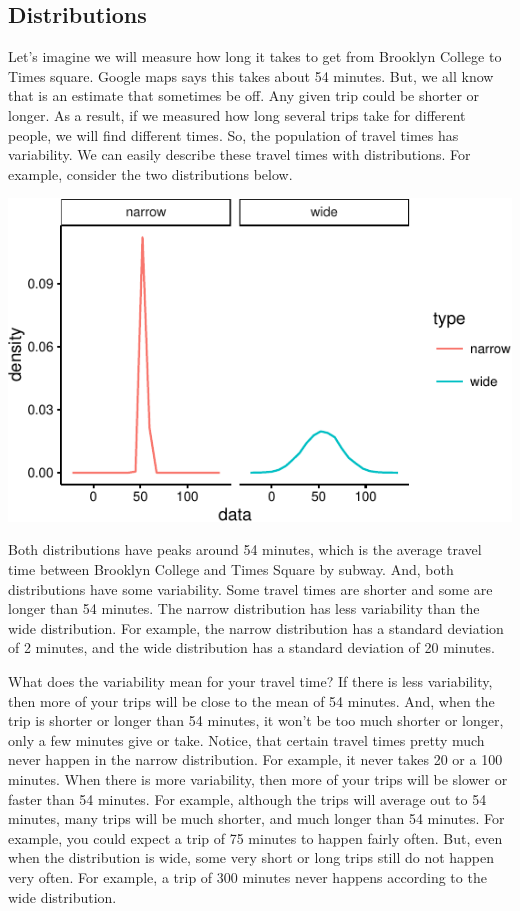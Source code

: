 
\subsection{Distributions}\label{distributions}

Let's imagine we will measure how long it takes to get from Brooklyn
College to Times square. Google maps says this takes about 54 minutes.
But, we all know that is an estimate that sometimes be off. Any given
trip could be shorter or longer. As a result, if we measured how long
several trips take for different people, we will find different times.
So, the population of travel times has variability. We can easily
describe these travel times with distributions. For example, consider
the two distributions below.

\includegraphics{Ttest_files/figure-latex/unnamed-chunk-1-1}

Both distributions have peaks around 54 minutes, which is the average
travel time between Brooklyn College and Times Square by subway. And,
both distributions have some variability. Some travel times are shorter
and some are longer than 54 minutes. The narrow distribution has less
variability than the wide distribution. For example, the narrow
distribution has a standard deviation of 2 minutes, and the wide
distribution has a standard deviation of 20 minutes.

What does the variability mean for your travel time? If there is less
variability, then more of your trips will be close to the mean of 54
minutes. And, when the trip is shorter or longer than 54 minutes, it
won't be too much shorter or longer, only a few minutes give or take.
Notice, that certain travel times pretty much never happen in the narrow
distribution. For example, it never takes 20 or a 100 minutes. When
there is more variability, then more of your trips will be slower or
faster than 54 minutes. For example, although the trips will average out
to 54 minutes, many trips will be much shorter, and much longer than 54
minutes. For example, you could expect a trip of 75 minutes to happen
fairly often. But, even when the distribution is wide, some very short
or long trips still do not happen very often. For example, a trip of 300
minutes never happens according to the wide distribution.

